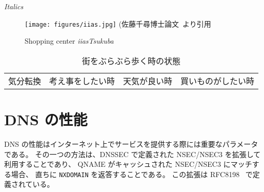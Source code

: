 {\itshape Italics}

\begin{figure}[htbp]
\centering
\texttt{[image: figures/iias.jpg]}
{\footnotesize(佐藤千尋博士論文~\cite{chihiro2014}より引用}
 \caption{Shopping center {\itshape iiasTsukuba}}
  \label{iias}
\end{figure}


\begin{table}[ht]
\caption{街をぶらぶら歩く時の状態}
\label{cluster_category}
\centering
\small
\begin{tabu} to \linewidth {|c|c|c|c|}
\hline
 &
 &
 &
\\
\hline
気分転換 & 考え事をしたい時 & 天気が良い時 & 買いものがしたい時\\
\hline
\end{tabu}
\end{table}

\section{DNS の性能}

DNS の性能はインターネット上でサービスを提供する際には重要なパラメータである。
その一つの方法は、DNSSEC で定義された NSEC/NSEC3 を拡張して利用することであり、
QNAME がキャッシュされた NSEC/NSEC3 にマッチする場合、
直ちに {\tt NXDOMAIN} を返答することである。
この拡張は RFC8198~\cite{rfc8198} で定義されている。

\putendnotes


